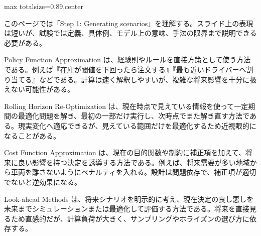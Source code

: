 \begin{minipage}[t]{0.58\textwidth}
\begin{adjustbox}{max totalsize={\textwidth}{0.89\textheight},center}
\begin{minipage}{\textwidth}\scriptsize
{}このページでは「Step 1: Generating scenarios」を理解する。スライド上の表現は短いが、試験では定義、具体例、モデル上の意味、手法の限界まで説明できる必要がある。\par
Policy Function Approximation は、経験則やルールを直接方策として使う方法である。例えば『在庫が閾値を下回ったら注文する』『最も近いドライバーへ割り当てる』などである。計算は速く解釈しやすいが、複雑な将来影響を十分に扱えない可能性がある。\par
Rolling Horizon Re-Optimization は、現在時点で見えている情報を使って一定期間の最適化問題を解き、最初の一部だけ実行し、次時点でまた解き直す方法である。現実変化へ適応できるが、見えている範囲だけを最適化するため近視眼的になることがある。\par
Cost Function Approximation は、現在の目的関数や制約に補正項を加えて、将来に良い影響を持つ決定を誘導する方法である。例えば、将来需要が多い地域から車両を離さないようにペナルティを入れる。設計は問題依存で、補正項が適切でないと逆効果になる。\par
Look-ahead Methods は、将来シナリオを明示的に考え、現在決定の良し悪しを未来までシミュレーションまたは最適化して評価する方法である。将来を直接見るため直感的だが、計算負荷が大きく、サンプリングやホライズンの選び方に依存する。\par

\end{minipage}
\end{adjustbox}
\end{minipage}
